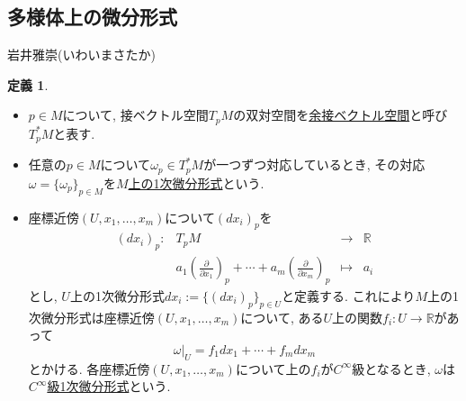 \documentclass[dvipdfmx,a4paper,11pt]{article}
\newcommand{\R}{\mathbb{R}}
\theoremstyle{definition}
\newtheorem{dfn}[thm]{定義}
\newcommand{\pdrv}[2]{\frac{\partial #1}{\partial #2}}
\begin{document}
\newpage


\begin{center}
\section{多様体上の微分形式}
\label{sec-mfd-diff}
\end{center}
\begin{flushright}
 岩井雅崇(いわいまさたか)
\end{flushright}

    \begin{tcolorbox}[
    colback = white,
    colframe = green!35!black,
    fonttitle = \bfseries,
    breakable = true]
\begin{dfn}

\begin{itemize}
 \setlength{\parskip}{0cm}
  \setlength{\itemsep}{2pt} 
\item $p \in M$について, 接ベクトル空間$T_{p}M$の双対空間を\underline{余接ベクトル空間}と呼び$T_{p}^{*}M$と表す.
\item 任意の$p \in M$について$\omega_{p} \in T_{p}^{*}M$が一つずつ対応しているとき, その対応$\omega = \{ \omega_p\}_{p \in M}$を\underline{$M$上の1次微分形式}という.
\item 座標近傍$(U, x_1, \ldots, x_m)$について$(dx_{i})_{p}$を
    $$
     \begin{matrix}
    (dx_i )_{p} : &T_{p}M & \rightarrow &\R\\
    & a_1\left( \pdrv{}{x_1}\right)_p  + \cdots + a_m\left(\pdrv{}{x_m}\right)_p & \mapsto  &a_i
    \end{matrix}
     $$
    とし, $U$上の1次微分形式$dx_i  := \{ (dx_{i})_p\}_{p \in U}$と定義する. これにより$M$上の1次微分形式は座標近傍$(U, x_1, \ldots, x_m)$について, ある$U$上の関数$f_i : U \rightarrow \R$があって
    $$
    \omega|_{U} = f_1dx_1 + \cdots + f_mdx_m
    $$
    とかける. 各座標近傍$(U, x_1, \ldots, x_m)$について上の$f_i $が$C^{\infty}$級となるとき, $\omega$は\underline{$C^{\infty}$級1次微分形式}という.
\end{itemize}
    \end{dfn}
    \end{tcolorbox}
    
\end{document}
